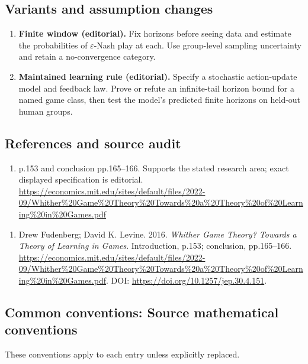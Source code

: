 \documentclass[11pt,a4paper]{article}
\begin{document}
\subsection*{Variants and assumption changes}
\begin{enumerate}
\item \textbf{Finite window (editorial).} Fix horizons before seeing data and estimate the probabilities of \(\varepsilon\)-Nash play at each. Use group-level sampling uncertainty and retain a no-convergence category.
\item \textbf{Maintained learning rule (editorial).} Specify a stochastic action-update model and feedback law. Prove or refute an infinite-tail horizon bound for a named game class, then test the model’s predicted finite horizons on held-out human groups.
\end{enumerate}
\subsection*{References and source audit}
\begin{enumerate}
\item p.153 and conclusion pp.165–166. Supports the stated research area; exact displayed specification is editorial. \url{https://economics.mit.edu/sites/default/files/2022-09/Whither%20Game%20Theory%20Towards%20a%20Theory%20of%20Learning%20in%20Games.pdf}
\end{enumerate}
\begin{enumerate}\raggedright
\item\hypertarget{definitions:source:30007562:1}{} Drew Fudenberg; David K. Levine. 2016. \emph{Whither Game Theory? Towards a Theory of Learning in Games}. Introduction, p.153; conclusion, pp.165–166.
\url{https://economics.mit.edu/sites/default/files/2022-09/Whither%20Game%20Theory%20Towards%20a%20Theory%20of%20Learning%20in%20Games.pdf}.
DOI: \url{https://doi.org/10.1257/jep.30.4.151}.
\end{enumerate}

\subsection*{Common conventions: Source mathematical conventions}

These conventions apply to each entry unless explicitly replaced.
\end{document}
